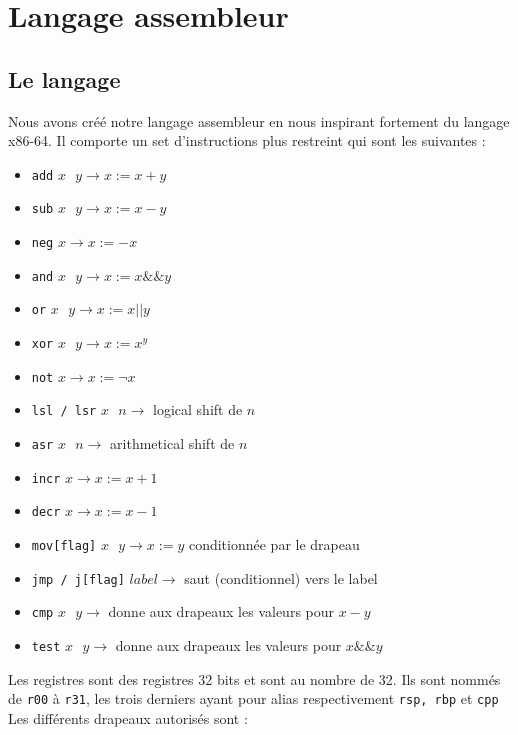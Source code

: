 \documentclass[10pt,a4paper,notitlepage ]{article}
\begin{document}
\section{Langage assembleur}
\subsection{Le langage}
	\par{Nous avons créé notre langage assembleur en nous inspirant fortement du langage x86-64. Il comporte un set d'instructions plus restreint qui sont les suivantes :
	\begin{itemize}
		\item \texttt{add} $x \text{ } y \rightarrow x := x + y$
		\item \texttt{sub} $x \text{ } y \rightarrow x := x - y$
		\item \texttt{neg} $x \rightarrow x := - x $
		\item \texttt{and} $x \text{ } y \rightarrow x := x \&\& y$
		\item \texttt{or} $x \text{ } y \rightarrow x := x || y$
		\item \texttt{xor} $x \text{ } y \rightarrow x := x ^ y$
		\item \texttt{not} $x \rightarrow x := \neg x$
		\item \texttt{lsl / lsr} $x \text{ } n \rightarrow $ logical shift de $n$
		\item \texttt{asr} $x \text{ } n \rightarrow $ arithmetical shift de $n$
		\item \texttt{incr} $x \rightarrow x := x + 1$
		\item \texttt{decr} $x \rightarrow x := x - 1$
		\item \texttt{mov[flag]} $x \text{ } y \rightarrow x := y$ conditionnée par le drapeau
		\item \texttt{jmp / j[flag]} $label \rightarrow $ saut (conditionnel) vers le label
		\item \texttt{cmp} $x \text{ } y \rightarrow $ donne aux drapeaux les valeurs pour $x - y$
		\item \texttt{test} $x \text{ } y \rightarrow $ donne aux drapeaux les valeurs pour $x \&\& y$
	\end{itemize}
	Les registres sont des registres 32 bits et sont au nombre de 32. Ils sont nommés de \texttt{r00} à \texttt{r31}, les trois derniers ayant pour alias respectivement \texttt{rsp, rbp} et \texttt{cpp}\\
	Les différents drapeaux autorisés sont :
	\begin{itemize}

\end{itemize}}
\end{document}
